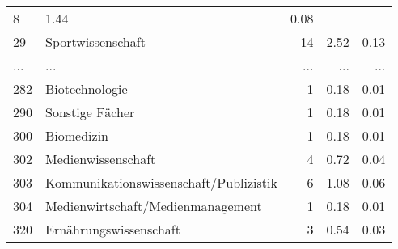 \begin{longtable}{lXrrr}
          \num{8} &
          \num[round-mode=places,round-precision=2]{1,44} &
          \num[round-mode=places,round-precision=2]{0,08} \\
        29 & \multicolumn{1}{X}{Sportwissenschaft} & %
          \num{14} &
          \num[round-mode=places,round-precision=2]{2,52} &
          \num[round-mode=places,round-precision=2]{0,13} \\
       ... & ... & ... & ... & ... \\
        282 & \multicolumn{1}{X}{Biotechnologie} & %
          \num{1} &
          \num[round-mode=places,round-precision=2]{0,18} &
          \num[round-mode=places,round-precision=2]{0,01} \\

        290 & \multicolumn{1}{X}{Sonstige Fächer} & %
          \num{1} &
          \num[round-mode=places,round-precision=2]{0,18} &
          \num[round-mode=places,round-precision=2]{0,01} \\

        300 & \multicolumn{1}{X}{Biomedizin} & %
          \num{1} &
          \num[round-mode=places,round-precision=2]{0,18} &
          \num[round-mode=places,round-precision=2]{0,01} \\

        302 & \multicolumn{1}{X}{Medienwissenschaft} & %
          \num{4} &
          \num[round-mode=places,round-precision=2]{0,72} &
          \num[round-mode=places,round-precision=2]{0,04} \\

        303 & \multicolumn{1}{X}{Kommunikationswissenschaft/Publizistik} & %
          \num{6} &
          \num[round-mode=places,round-precision=2]{1,08} &
          \num[round-mode=places,round-precision=2]{0,06} \\

        304 & \multicolumn{1}{X}{Medienwirtschaft/Medienmanagement} & %
          \num{1} &
          \num[round-mode=places,round-precision=2]{0,18} &
          \num[round-mode=places,round-precision=2]{0,01} \\

        320 & \multicolumn{1}{X}{Ernährungswissenschaft} & %
          \num{3} &
          \num[round-mode=places,round-precision=2]{0,54} &
          \num[round-mode=places,round-precision=2]{0,03} \\


\end{longtable}
